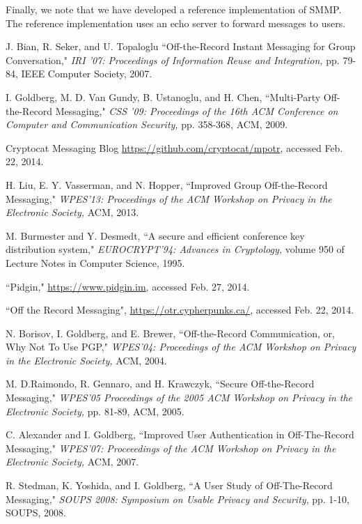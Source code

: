 \documentclass[%
preprint,
amsmath,amssymb,
aps,
prb,
floatfix,
]{revtex4-1}
\begin{document}
Finally, we note that we have developed a reference
implementation\cite{ref:referenceimplementation} of SMMP. The reference
implementation uses an echo server to forward messages to users.
\begin{thebibliography}{99}
 J. Bian, R. Seker, and U. Topaloglu ``Off-the-Record Instant
Messaging for Group Conversation," \textit{IRI '07: Proceedings of Information
Reuse and Integration,} pp. 79-84, IEEE Computer Society, 2007.

 I. Goldberg, M. D. Van Gundy, B. Ustanoglu, and H. Chen,
``Multi-Party Off-the-Record Messaging," \textit{CSS '09: Proceedings of the
16th ACM Conference on Computer and Communication Security,} pp. 358-368, ACM,
2009.

 Cryptocat Messaging Blog
\url{https://github.com/cryptocat/mpotr}, accessed Feb. 22, 2014.

 H. Liu, E. Y. Vasserman, and N. Hopper, ``Improved Group
Off-the-Record Messaging," \textit{WPES'13: Proceedings of the ACM Workshop on
Privacy in the Electronic Society,} ACM, 2013.

 M. Burmester and Y. Desmedt, ``A secure and efficient
conference key distribution system," \textit{EUROCRYPT'94: Advances in
Cryptology,} volume 950 of Lecture Notes in Computer Science, 1995.

 ``Pidgin," \url{https://www.pidgin.im}, accessed Feb. 27,
2014.

 ``Off the Record Messaging",
\url{https://otr.cypherpunks.ca/}, accessed Feb. 22, 2014.

 N. Borisov, I. Goldberg, and E. Brewer, ``Off-the-Record
Communication, or, Why Not To Use PGP," \textit{WPES'04: Proceedings of the
ACM Workshop on Privacy in the Electronic Society,} ACM, 2004.

 M. D.Raimondo, R. Gennaro, and H. Krawczyk, ``Secure
Off-the-Record Messaging," \textit{WPES'05 Proceedings of the 2005 ACM Workshop
on Privacy in the Electronic Society,} pp. 81-89, ACM, 2005.

 C. Alexander and I. Goldberg, ``Improved User Authentication
in Off-The-Record Messaging," \textit{WPES'07: Proceeedings of the ACM Workshop
on Privacy in the Electronic Society,} ACM, 2007.

 R. Stedman, K. Yoshida, and I. Goldberg, ``A User Study of
Off-The-Record Messaging," \textit{SOUPS 2008: Symposium on Usable Privacy and
Security}, pp. 1-10, SOUPS, 2008.


\end{thebibliography}
\end{document}
